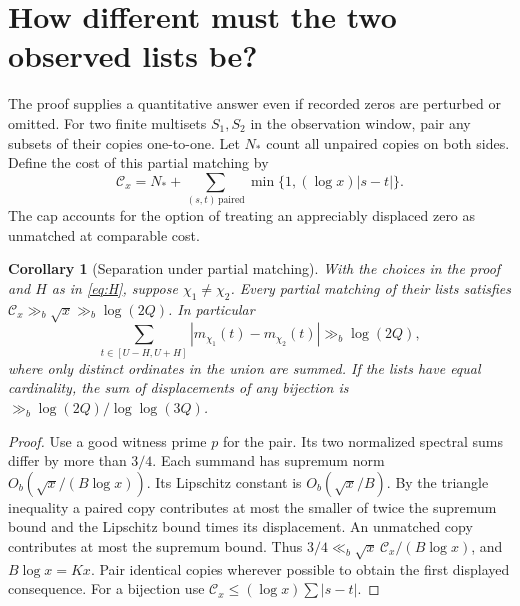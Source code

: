 \documentclass[11pt]{article}
\newtheorem{corollary}[theorem]{Corollary}
\begin{document}
\section{How different must the two observed lists be?}
The proof supplies a quantitative answer even if recorded zeros are perturbed or
omitted. For two finite multisets $S_1,S_2$ in the observation window, pair any
subsets of their copies one-to-one. Let $N_*$ count all unpaired copies on both
sides. Define the cost of this partial matching by
\[
 \mathcal C_x=N_*+
    \sum_{(s,t)\,\mathrm{paired}}\min\{1,(\log x)|s-t|\}.
\]
The cap accounts for the option of treating an appreciably displaced zero as
unmatched at comparable cost.
\begin{corollary}[Separation under partial matching]\label{cor:transport}
With the choices in the proof and $H$ as in \eqref{eq:H}, suppose
$\chi_1\ne\chi_2$. Every partial matching of their lists satisfies
$\mathcal C_x\gg_b\sqrt x\gg_b\log(2Q)$. In particular
\[
 \sum_{t\in[U-H,U+H]} |m_{\chi_1}(t)-m_{\chi_2}(t)|
       \gg_b\log(2Q),
\]
where only distinct ordinates in the union are summed. If the lists have equal
cardinality, the sum of displacements of any bijection is
$\gg_b \log(2Q)/\log\log(3Q)$.
\end{corollary}
\begin{proof}
Use a good witness prime $p$ for the pair. Its two normalized spectral sums differ
by more than $3/4$. Each summand has supremum norm $O_b(\sqrt{x}/(B\log x))$.
Its Lipschitz constant is $O_b(\sqrt{x}/B)$. By the triangle inequality a paired
copy contributes at most the smaller of twice the supremum bound and the
Lipschitz bound times its displacement. An unmatched copy contributes at most
the supremum bound. Thus
$3/4\ll_b\sqrt{x}\,\mathcal C_x/(B\log x)$, and $B\log x=Kx$.
Pair identical copies wherever possible to obtain the first displayed consequence.
For a bijection use $\mathcal C_x\le(\log x)\sum |s-t|$.
\end{proof}
\end{document}

